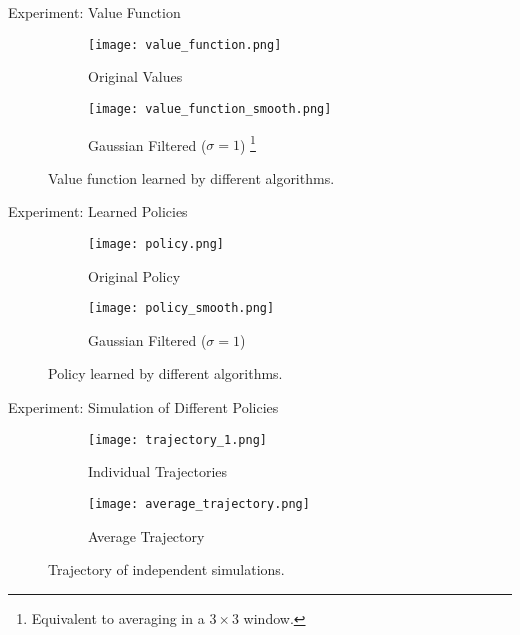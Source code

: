 \begin{frame}{Experiment: Value Function}
\begin{figure}
    \centering
    \begin{subfigure}{\textwidth}
        \centering
        \texttt{[image: value\_function.png]}
        \caption{Original Values}
    \end{subfigure}
    \begin{subfigure}{\textwidth}
        \centering
        \texttt{[image: value\_function\_smooth.png]}
        \caption{Gaussian Filtered ($\sigma = 1$) \footnote{Equivalent to averaging in a $3 \times 3$ window.}}
    \end{subfigure}
    \caption{Value function learned by different algorithms.}
\end{figure}
\end{frame}

\begin{frame}{Experiment: Learned Policies}
\begin{figure}
    \centering
    \begin{subfigure}{\textwidth}
        \centering
        \texttt{[image: policy.png]}
        \caption{Original Policy}
    \end{subfigure}
    \begin{subfigure}{\textwidth}
        \centering
        \texttt{[image: policy\_smooth.png]}
        \caption{Gaussian Filtered ($\sigma = 1$)}
    \end{subfigure}
    \caption{Policy learned by different algorithms.}
\end{figure}
\end{frame}


\begin{frame}{Experiment: Simulation of Different Policies}
\begin{figure}
    \centering
    \begin{subfigure}{0.45\textwidth}
        \centering
        \texttt{[image: trajectory\_1.png]}
        \caption{Individual Trajectories}
    \end{subfigure}
    \begin{subfigure}{0.45\textwidth}
        \centering
        \texttt{[image: average\_trajectory.png]}
        \caption{Average Trajectory}
    \end{subfigure}
    \caption{Trajectory of independent simulations.}
\end{figure}
\end{frame}

